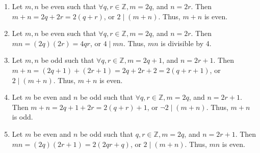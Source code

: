 \documentclass[11pt]{exam}
\begin{document}
\begin{enumerate}[leftmargin=0pt]
\begin{enumerate}[label=(\alph*)]
    \item Let $m, n$ be even such that $\forall q, r \in \mathbb{Z}, m = 2q$, and $n = 2r$. Then $m + n = 2q + 2r = 2(q + r)$, or $2 \mid (m + n)$. Thus, $m + n$ is even.
    \item Let $m, n$ be even such that $\forall q, r \in \mathbb{Z}, m = 2q$, and $n = 2r$. Then $mn = (2q)(2r) = 4qr$, or $4 \mid mn$. Thus, $mn$ is divisible by 4.
    \item Let $m, n$ be odd such that $\forall q, r \in \mathbb{Z}, m = 2q + 1$, and $n = 2r + 1$. Then $m + n = (2q + 1) + (2r + 1) = 2q + 2r + 2 = 2(q + r + 1)$, or $2 \mid (m + n)$. Thus, $m + n$ is even.
    \item Let $m$ be even and $n$ be odd such that $\forall q, r \in \mathbb{Z}, m = 2q$, and $n = 2r + 1$. Then $m + n = 2q + 1 + 2r = 2(q + r) + 1$, or $\neg 2 \mid (m + n)$. Thus, $m + n$ is odd.
    \item Let $m$ be even and $n$ be odd such that $q, r \in \mathbb{Z}, m = 2q$, and $n = 2r + 1$. Then $mn = (2q)(2r + 1) = 2(2qr + q)$, or $2 \mid (m + n)$. Thus, $mn$ is even.
\end{enumerate}


\end{enumerate}
\end{document}
